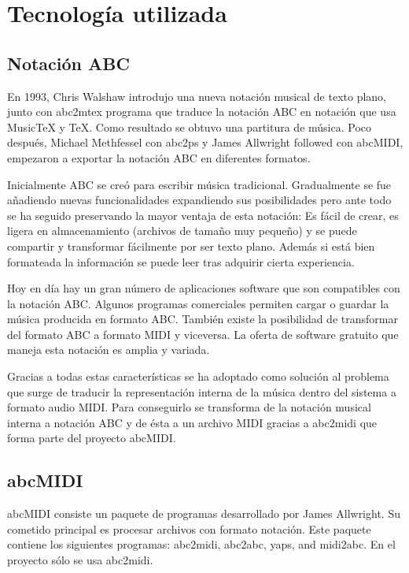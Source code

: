 \chapter{Tecnología utilizada}

\section{Notación ABC}
\label{sec:NotacionABC}

En 1993, Chris Walshaw introdujo una nueva notación musical de texto plano, junto con abc2mtex programa que traduce la notación ABC en notación que usa MusicTeX y TeX. Como resultado se obtuvo una partitura de música. Poco después, Michael Methfessel con abc2ps y James Allwright followed con abcMIDI, empezaron a exportar la notación ABC en diferentes formatos.

Inicialmente ABC se creó para escribir música tradicional. Gradualmente se fue añadiendo nuevas funcionalidades expandiendo sus posibilidades pero ante todo se ha seguido preservando la mayor ventaja de esta notación: Es fácil de crear, es ligera en almacenamiento (archivos de tamaño muy pequeño) y se puede compartir y transformar fácilmente por ser texto plano. Además si está bien formateada la información se puede leer tras adquirir cierta experiencia.

Hoy en día hay un gran número de aplicaciones software que son compatibles con la notación ABC. Algunos programas comerciales permiten cargar o guardar la música producida en formato ABC. También existe la posibilidad de transformar del formato ABC a formato MIDI y viceversa. La oferta de software gratuito que maneja esta notación es amplia y variada. 

Gracias a todas estas características se ha adoptado como solución al problema que surge de traducir la representación interna de la música dentro del sistema a formato audio MIDI. Para conseguirlo se transforma de la notación musical interna a notación ABC y de ésta a un archivo MIDI gracias a abc2midi que forma parte del proyecto abcMIDI.

\section{abcMIDI}
\label{sec:abcMIDI}

abcMIDI consiste un paquete de programas desarrollado por James Allwright. Su cometido principal es procesar archivos con formato notación. Este paquete contiene los siguientes programas: abc2midi, abc2abc, yaps, and midi2abc. En el proyecto sólo se usa abc2midi.

